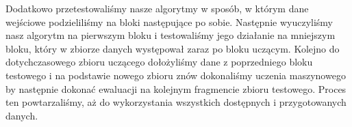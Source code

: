 Dodatkowo przetestowaliśmy nasze algorytmy w sposób, w którym dane wejściowe podzieliliśmy na bloki następujące po sobie. Następnie wyuczyliśmy nasz algorytm na pierwszym bloku i testowaliśmy jego działanie na mniejszym bloku, który w zbiorze danych występował zaraz po bloku uczącym. Kolejno do dotychczasowego zbioru uczącego dołożyliśmy dane z poprzedniego bloku testowego i na podstawie nowego zbioru znów dokonaliśmy uczenia maszynowego by następnie dokonać ewaluacji na kolejnym fragmencie zbioru testowego. Proces ten powtarzaliśmy, aż do wykorzystania wszystkich dostępnych i przygotowanych danych.

